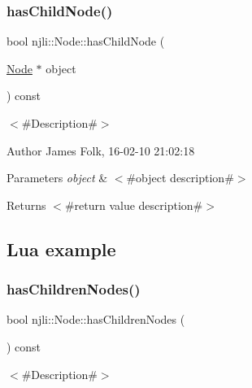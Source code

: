 \subsubsection{\texorpdfstring{has\+Child\+Node()}{hasChildNode()}}
{\footnotesize\ttfamily bool njli\+::\+Node\+::has\+Child\+Node (\begin{DoxyParamCaption}\item[{\mbox{\hyperlink{classnjli_1_1_node}{Node}} $\ast$}]{object }\end{DoxyParamCaption}) const}



$<$\#\+Description\#$>$ 

\begin{DoxyAuthor}{Author}
James Folk, 16-\/02-\/10 21\+:02\+:18
\end{DoxyAuthor}

\begin{DoxyParams}{Parameters}
{\em object} & $<$\#object description\#$>$\\
\hline
\end{DoxyParams}
\begin{DoxyReturn}{Returns}
$<$\#return value description\#$>$
\end{DoxyReturn}
\hypertarget{classnjli_1_1_steering_behavior_wander_ex1}{}\subsection{Lua example}\label{classnjli_1_1_steering_behavior_wander_ex1}

\begin{DoxyCodeInclude}
\end{DoxyCodeInclude}
\mbox{\label{classnjli_1_1_node_a41ff168b602fb88d4d79811a18dad3d0}} 
\subsubsection{\texorpdfstring{has\+Children\+Nodes()}{hasChildrenNodes()}}
{\footnotesize\ttfamily bool njli\+::\+Node\+::has\+Children\+Nodes (\begin{DoxyParamCaption}{ }\end{DoxyParamCaption}) const}



$<$\#\+Description\#$>$ 

